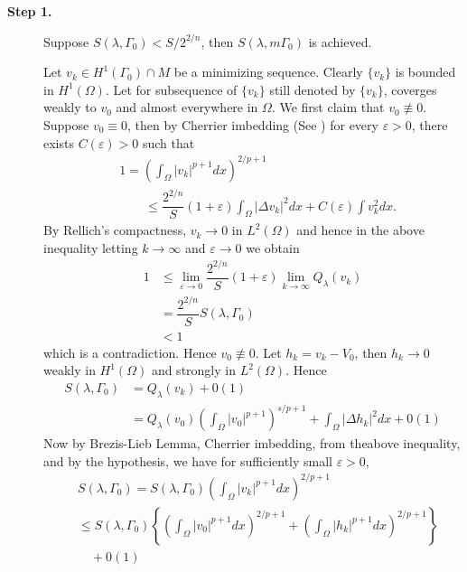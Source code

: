 \begin{description}
\item[{\rm \bf Step 1.}] Suppose $S(\lambda, \Gamma_{0}) < S/2^{2/n}$, then $S(\lambda,m \Gamma_{0})$ is achieved.\label{chap2-enum Step1}

Let $v_{k} \in H^{1}(\Gamma_{0})\cap M$ be a minimizing sequence. Clearly $\{v_{k}\}$ is bounded in $H^{1}(\Omega)$. Let for subsequence of $\{v_{k}\}$ still denoted by $\{v_{k}\}$, coverges weakly to $v_{0}$ and almost everywhere in $\Omega$. We first claim that $v_{0}\nequiv 0$. Suppose $v_{0}\equiv 0$, then by Cherrier imbedding (See \cite{chap2-key8}) for every $\varepsilon > 0$, there exists $C(\varepsilon) > 0$ such that
\begin{align*}
& 1 = \left(\int_{\Omega}|v_{k}|^{p+1}dx\right)^{2/p+1}\\
&\qquad \leq \dfrac{2^{2/n}}{S}(1+\varepsilon) \int_{\Omega}|\Delta v_{k}|^{2}dx + C(\varepsilon)\int v_{k}^{2}dx.
\end{align*}
By Rellich's compactness, $v_{k} \rightarrow 0$ in $L^{2}(\Omega)$ and hence in the above inequality letting $k \rightarrow \infty$ and $\varepsilon \rightarrow 0$ we obtain
\begin{align*}
1 &\leq \lim_{\varepsilon \rightarrow 0}\dfrac{2^{2/n}}{S}(1+\varepsilon) \lim_{k \rightarrow \infty} Q_{\lambda}(v_{k})\\
&= \dfrac{2^{2/n}}{S}S(\lambda, \Gamma_{0})\\
&< 1
\end{align*}
which is a contradiction. Hence $v_{0}\nequiv 0$. Let $h_{k} = v_{k}-V_{0}$, then $h_{k}\rightarrow 0$ weakly in $H^{1}(\Omega)$ and strongly in $L^{2}(\Omega)$. Hence
\begin{align*}
S(\lambda, \Gamma_{0}) &= Q_{\lambda}(v_{k}) + 0(1)\\
&= Q_{\lambda}(v_{0})\left(\int_{\Omega} |v_{0}|^{p+1}\right)^{s/p+1} + \int_{\Omega} |\Delta h_{k}|^{2}dx + 0(1)
\end{align*}
Now by Brezis-Lieb Lemma, Cherrier imbedding, from the\break above inequality, and by the hypothesis, we have for sufficiently small $\varepsilon > 0$,
\begin{align*}
&S(\lambda, \Gamma_{0}) = S(\lambda, \Gamma_{0}) \left(\int_{\Omega}|v_{k}|^{p+1}dx\right)^{2/p+1}\\
&\leq S(\lambda, \Gamma_{0}) \left\{\left(\int_{\Omega}|v_{0}|^{p+1}dx\right)^{2/p+1} + \left(\int_{\Omega}|h_{k}|^{p+1}dx\right)^{2/p+1}\right\} \\
&\quad + 0(1)\\

\end{align*}
\end{description}
